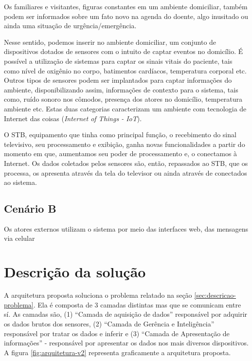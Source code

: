Os familiares e visitantes, figuras constantes em um ambiente domiciliar, também
podem ser informados sobre um fato novo na agenda do doente, algo inusitado ou 
ainda uma situação de urgência/emergência.

Nesse sentido, podemos inserir no ambiente domiciliar, um conjunto de
dispositivos dotados de sensores com o intuito de captar eventos no domicílio. É
possível a utilização de sistemas para captar os sinais vitais do paciente, tais
como nível de oxigênio no corpo, batimentos cardíacos, temperatura corporal etc.
Outros tipos de sensores podem ser implantados para captar informações do
ambiente, disponibilizando assim, informações de contexto para o sistema,  tais
como, ruído sonoro nos cômodos, presença dos atores no domicílio, temperatura
ambiente etc. Estas duas categorias caracterizam um  ambiente com tecnologia de
Internet das coisas (\textit{Internet of Things  - IoT}).

O STB, equipamento que tinha como principal função, o recebimento do sinal
televisivo, seu processamento e  exibição, ganha novas funcionalidades a partir
do momento em que, aumentamos seu  poder de processamento e, o conectamos à 
Internet. Os dados coletados pelos sensores são, então, repassados ao STB,
que os processa, os apresenta através da tela do televisor ou ainda através de
\smartphones[] conectados ao sistema.


\subsection{Cenário B} \label{subsec:cenario-b}

Os atores externos utilizam o sistema por meio das interfaces web, das mensagens
via celular

\section{Descrição da solução}
\label{sec:descricao-solucao}

A arquitetura proposta soluciona o problema relatado na seção  
\ref{sec:descricao-problema}. Ela é composta de 3 camadas distintas mas que
se comunicam entre sí. As camadas são, (1) ``Camada de aquisição de dados''
responsável por adquirir os dados brutos dos sensores, (2) ``Camada de Gerência 
e Inteligência'' responsável por tratar os dados e inferir e (3) ``Camada de 
Apresentação de informações'' - responsável por apresentar os dados nos mais
diversos dispositivos. A figura \ref{fig:arquitetura-v2} representa graficamente
a arquitetura proposta.

